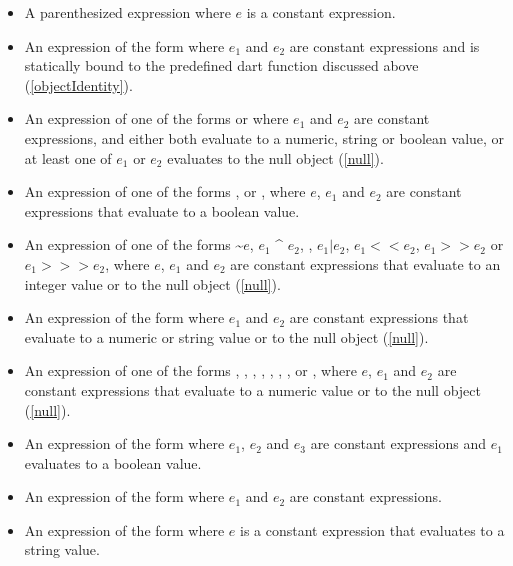 \documentclass{article}
\begin{document}
\begin{itemize}
\item A parenthesized expression  where $e$ is a constant expression.
\item An expression of the form  where $e_1$ and $e_2$ are constant expressions and  is statically bound to the predefined dart function  discussed above (\ref{objectIdentity}).
\item An expression of one of the forms  or  where $e_1$ and $e_2$ are constant expressions, and either both evaluate to a numeric, string or boolean value, or at least one of $e_1$ or $e_2$ evaluates to the null object (\ref{null}).
\item An expression of one of the forms ,  or , where $e$, $e_1$ and $e_2$ are constant expressions that evaluate to a boolean value.
\item An expression of one of the forms \~{}$e$, $e_1$ \^{} $e_2$, , $e_1 | e_2$, $e_1 << e_2$, $e_1 >> e_2$ or $e_1 >>> e_2$, where $e$, $e_1$ and $e_2$ are constant expressions that evaluate to an integer value or to the null object (\ref{null}).
\item An expression of the form  where $e_1$ and $e_2$ are constant expressions that evaluate to a numeric or string value or to the null object (\ref{null}).
\item An expression of one of the forms , , ,  , , , ,  or , where $e$, $e_1$ and $e_2$ are constant expressions that evaluate to a numeric value or to the null object (\ref{null}).
\item An expression of the form  where $e_1$, $e_2$ and $e_3$ are constant expressions and $e_1$ evaluates to a boolean value.
\item An expression of the form  where $e_1$ and $e_2$ are constant expressions.
\item An expression of the form  where $e$ is a constant expression that evaluates to a string value.
\end{itemize}


\end{document}
